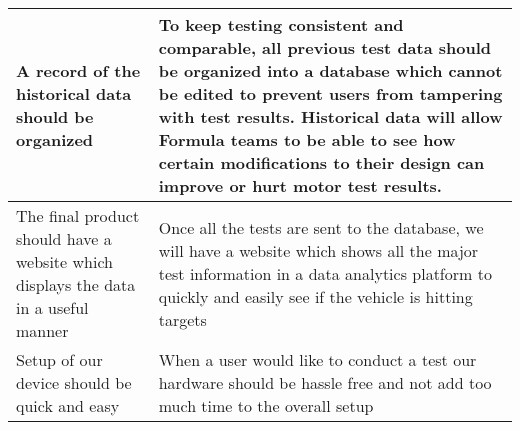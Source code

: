 \documentclass{article}
\begin{document}
\begin{table}[H]
\begin{tabular}{|p{4cm}|p{8cm}|}
        \\ \hline
        A record of the historical data should be organized                                
        & To keep testing consistent and comparable, all previous test data should be organized into a database which cannot be edited to prevent users from tampering with test results. Historical data will allow Formula teams to be able to see how certain modifications to their design can improve or hurt motor test results. 
        \newline                                
        \\ \hline
        The final product should have a website which displays the data in a useful manner                                
        & Once all the  tests are sent to the database, we will have a website which shows all the major test information in a data analytics platform to quickly and easily see if the vehicle is hitting targets  
        \newline                              
        \\ \hline
        Setup of our device should be quick and easy                               
        & When a user would like to conduct a test our hardware should be hassle free and not add too much time to the overall setup
        \newline                            
        \\ \hline
        \end{tabular}
    \end{table}
    
\end{document}
